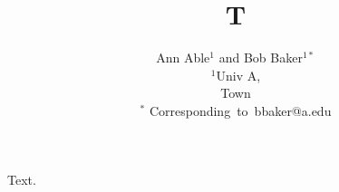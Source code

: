 \documentclass{article}
\title{T}
\author{Ann Able$^1$ and Bob Baker$^{1*}$\\
$^1$Univ A,\\ Town\\
$^{*}$ Corresponding\ to\ bbaker@a.edu}
\date{}
\begin{document}
\maketitle
Text.
\end{document}
